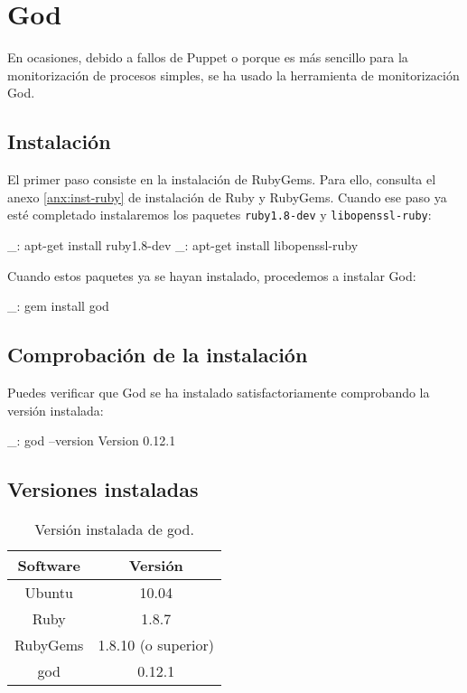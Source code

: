 \chapter{God}
\label{anx:god}


En ocasiones, debido a fallos de Puppet o porque es más sencillo para la monitorización de procesos simples, se ha usado la herramienta de monitorización God.


\section{Instalación}

El primer paso consiste en la instalación de RubyGems. Para ello, consulta el anexo \ref{anx:inst-ruby} de instalación de Ruby y RubyGems. Cuando ese paso ya esté completado instalaremos los paquetes \texttt{ruby1.8-dev} y \texttt{libopenssl-ruby}:

\begin{bashcode}
_: apt-get install ruby1.8-dev
_: apt-get install libopenssl-ruby
\end{bashcode}

Cuando estos paquetes ya se hayan instalado, procedemos a instalar God:

\begin{bashcode}
_: gem install god
\end{bashcode}


\section{Comprobación de la instalación}

Puedes verificar que God se ha instalado satisfactoriamente comprobando la versión instalada:

\begin{bashcode}
_: god --version
Version 0.12.1
\end{bashcode}


\section{Versiones instaladas}

\begin{table}[!htbp]
\centering
   \begin{tabular}{|c|c|}
      \hline
      \textbf{Software} & \textbf{Versión} \\ \hline
      Ubuntu & 10.04 \\ \hline
      Ruby & 1.8.7 \\ \hline
      RubyGems & 1.8.10 (o superior) \\ \hline
      god & 0.12.1 \\ \hline
   \end{tabular}
\caption{Versión instalada de god.}
\label{table:god-versions}
\end{table}
